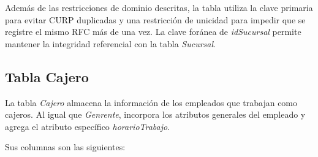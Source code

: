 Además de las restricciones de dominio descritas, la tabla utiliza la clave primaria para evitar CURP duplicadas y una restricción de unicidad para impedir que se registre el mismo RFC más de una vez. La clave foránea de \textit{idSucursal} permite mantener la integridad referencial con la tabla \textit{Sucursal}.

\subsection{Tabla Cajero}

La tabla \textit{Cajero} almacena la información de los empleados que trabajan como cajeros. Al igual que \textit{Genrente}, incorpora los atributos generales del empleado y agrega el atributo específico \textit{horarioTrabajo}.

Sus columnas son las siguientes:

